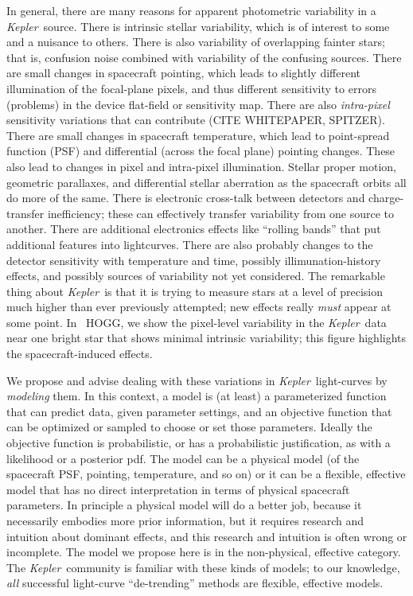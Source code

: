\documentclass[12pt, preprint]{aastex}
\newcommand{\project}[1]{\textsl{#1}}
\newcommand{\Kepler}{\project{Kepler}}
\begin{document}
In general, there are many reasons for apparent photometric variability in a \Kepler\ source.
There is intrinsic stellar variability,
  which is of interest to some and a nuisance to others.
There is also variability of overlapping fainter stars;
  that is, confusion noise combined with variability of the confusing sources.
There are small changes in spacecraft pointing,
  which leads to slightly different illumination of the focal-plane pixels,
  and thus different sensitivity to errors (problems) in the device flat-field or sensitivity map.
There are also \emph{intra-pixel} sensitivity variations that can contribute (CITE WHITEPAPER, SPITZER).
There are small changes in spacecraft temperature,
  which lead to point-spread function (PSF) and differential (across the focal plane) pointing changes.
These also lead to changes in pixel and intra-pixel illumination.
Stellar proper motion, geometric parallaxes, and differential stellar aberration as the spacecraft orbits all do more of the same.
There is electronic cross-talk between detectors and charge-transfer inefficiency;
  these can effectively transfer variability from one source to another.
There are additional electronics effects like ``rolling bands'' that put additional features into lightcurves.
There are also probably changes to the detector sensitivity with temperature and time,
  possibly illimunation-history effects,
  and possibly sources of variability not yet considered.
The remarkable thing about \Kepler\ is that it is trying to measure stars at a level of precision
  much higher than ever previously attempted;
  new effects really \emph{must} appear at some point.
In \figurename~HOGG, we show the pixel-level variability in the \Kepler\ data
  near one bright star that shows minimal intrinsic variability;
  this figure highlights the spacecraft-induced effects.

We propose and advise dealing with these variations in \Kepler\ light-curves by \emph{modeling} them.
In this context, a model is (at least) a parameterized function that can predict data, given parameter settings,
  and an objective function that can be optimized or sampled to choose or set those parameters.
Ideally the objective function is probabilistic, or has a probabilistic justification,
  as with a likelihood or a posterior pdf.
The model can be a physical model (of the spacecraft PSF, pointing, temperature, and so on)
  or it can be a flexible, effective model that has no direct interpretation in terms of physical spacecraft parameters.
In principle a physical model will do a better job,
  because it necessarily embodies more prior information,
  but it requires research and intuition about dominant effects,
  and this research and intuition is often wrong or incomplete.
The model we propose here is in the non-physical, effective category.
The \Kepler\ community is familiar with these kinds of models;
  to our knowledge, \emph{all} successful light-curve ``de-trending'' methods
  are flexible, effective models.
\end{document}

